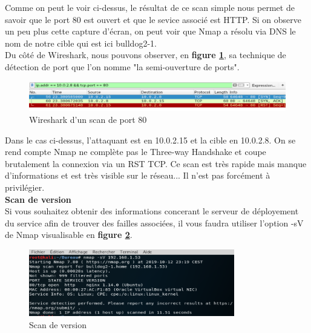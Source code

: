 Comme on peut le voir ci-dessus, le résultat de ce scan simple nous permet de savoir que le port 80 est ouvert et que le sevice associé est HTTP. Si on observe un peu plus cette capture d'écran, on peut voir que Nmap a résolu via DNS le nom de notre cible qui est ici bulldog2-1.\\
Du côté de Wireshark, nous pouvons observer, en \textbf{figure \ref{fig:wirebasique}}, sa technique de détection de port que l'on nomme "la semi-ouverture de ports".

\begin{figure}[htp!]
  \centering
  \setlength\figureheight{7cm}
  \setlength\figurewidth{9cm}
  \includegraphics[width=1\textwidth]{oui/images/nmap/Wirebasique.PNG}
  \caption{Wireshark d'un scan de port 80}
  \label{fig:wirebasique}
\end{figure}

Dans le cas ci-dessus, l'attaquant est en 10.0.2.15 et la cible en 10.0.2.8. On se rend compte Nmap ne complète pas le Three-way Handshake et coupe brutalement la connexion via un RST TCP.
Ce scan est très rapide mais manque d'informations et est très visible sur le réseau... Il n'est pas forcément à privilégier.\\

 \textbf{Scan de version}\\

Si vous souhaitez obtenir des informations concerant le serveur de déployement du service afin de trouver des failles associées, il vous faudra utiliser l'option -sV de Nmap visualisable en \textbf{figure \ref{fig:sv}}.

\begin{figure}[htp!]
  \centering
  \setlength\figureheight{7cm}
  \setlength\figurewidth{9cm}
  \includegraphics[width=0.8\textwidth]{oui/Ancien/imangeancien/Nmap/-sV.PNG}
  \caption{Scan de version}
  \label{fig:sv}
\end{figure}

